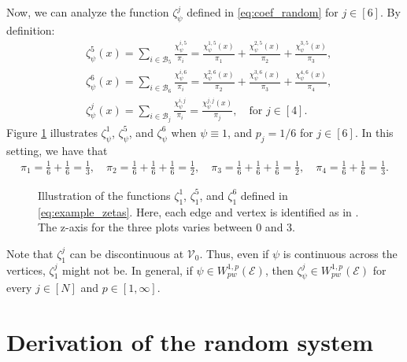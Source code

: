 \documentclass[10pt,a4paper]{amsart}
\begin{document}
Now, we can analyze the function $\zeta^j_\psi$ defined in \eqref{eq:coef_random} for $j\in[6]$. By definition:
\begin{align}\label{eq:example_zetas}
     &\nonumber\zeta^5_\psi(x) = \sum_{i\in \mathcal B_5}\frac{\chi_\psi^{i,5}}{\pi_i} =\frac{\chi_\psi^{1,5}(x)}{\pi_1}+\frac{\chi_\psi^{2,5}(x)}{\pi_2}+\frac{\chi_\psi^{3,5}(x)}{\pi_3}, \\
     &\zeta^6_\psi(x) = \sum_{i\in  \mathcal B_6}\frac{\chi_\psi^{i,6}}{\pi_i} =\frac{\chi_\psi^{2,6}(x)}{\pi_2}+\frac{\chi_\psi^{3,6}(x)}{\pi_3}+\frac{\chi_\psi^{4,6}(x)}{\pi_4}, \\
     &\nonumber\zeta^j_\psi(x) = \sum_{i\in  \mathcal B_j}\frac{\chi_\psi^{i,j}}{\pi_i} =\frac{\chi_\psi^{j,j}(x)}{\pi_j}, \quad \text{for }j\in[4].
\end{align}
Figure \ref{fig:chi_functions} illustrates $\zeta^1_\psi$, $\zeta^5_\psi$, and $\zeta^6_\psi$ when $\psi\equiv1$, and $p_j=1/6$ for $j\in [6]$. In this setting, we have that 
\begin{align*}
    \pi_1 = \frac{1}{6}+\frac{1}{6} =\frac{1}{3},\quad \pi_2 = \frac{1}{6}+\frac{1}{6}+\frac{1}{6} =\frac{1}{2},\quad
    \pi_3 = \frac{1}{6}+\frac{1}{6}+\frac{1}{6} =\frac{1}{2},\quad \pi_4 = \frac{1}{6}+\frac{1}{6} =\frac{1}{3}.
\end{align*}
\begin{figure}[h!]
    \centering
    
    \caption{Illustration of the functions $\zeta^1_1$, $\zeta^5_1$, and $\zeta^6_1$ defined in \eqref{eq:example_zetas}. Here, each edge and vertex is identified as in . The z-axis for the three plots varies between 0 and 3.}
    \label{fig:chi_functions}
\end{figure}
Note that $\zeta^j_1$ can be discontinuous at $\mathcal{V}_0$. Thus, even if $\psi$ is continuous across the vertices, $\zeta^j_1$ might not be. In general, if $\psi\in W^{1,p}_{pw}(\mathcal{E})$, then $\zeta^j_\psi\in W^{1,p}_{pw}(\mathcal{E})$ for every $j\in[N]$ and $p\in [1,\infty]$. 


\section{Derivation of the random system}\label{sec:random_derivation}
\end{document}
